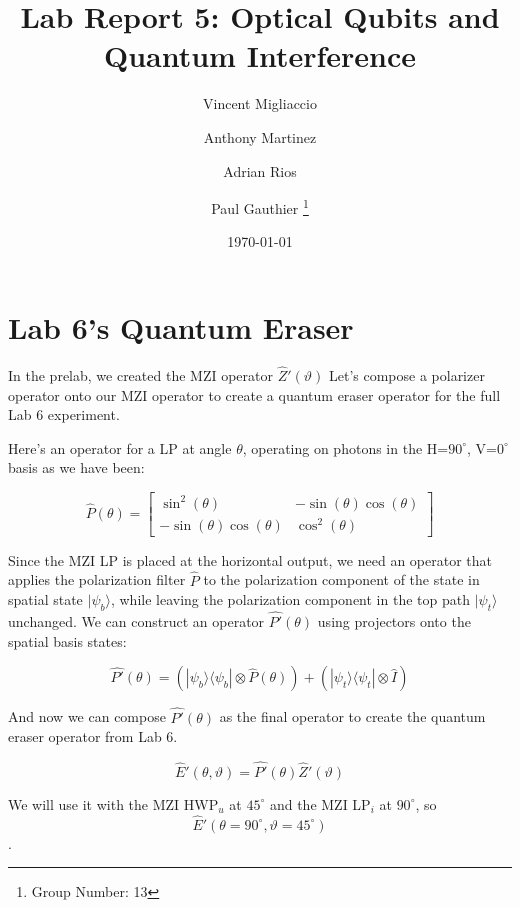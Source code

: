 \documentclass{article}
\title{Lab Report 5: Optical Qubits and Quantum Interference}
\author{
  Vincent Migliaccio \and
  Anthony Martinez \and
  Adrian Rios \and
  Paul Gauthier
  \thanks{Group Number: 13} \\
}
\date{\today}
\begin{document}


\section*{Lab 6's Quantum Eraser}

In the prelab, we created the MZI operator $\hat{Z}'(\vartheta)$
Let's compose a polarizer operator onto our MZI operator
to create a quantum eraser operator for the full Lab 6 experiment.

Here's an operator for a LP at angle $\theta$,
operating on photons in the H=$90^\circ$, V=$0^\circ$ basis as we have been:

$$\hat{P}(\theta) = \left[\begin{matrix}\sin^{2}{\left(\theta \right)} & - \sin{\left(\theta \right)} \cos{\left(\theta \right)}\\- \sin{\left(\theta \right)} \cos{\left(\theta \right)} & \cos^{2}{\left(\theta \right)}\end{matrix}\right]$$


Since the MZI LP is placed at the horizontal output, 
we need an operator that applies the polarization filter $\hat{P}$
to the polarization component of the state in spatial state $|\psi_b\rangle$,
while leaving the polarization component in the top path $|\psi_t\rangle$ unchanged.
We can construct an operator $\hat{P'}(\theta)$
using projectors onto the spatial basis states:

$$  \hat{P'}(\theta) = (|\psi_b\rangle\langle\psi_b| \otimes \hat{P}(\theta)) + (|\psi_t\rangle\langle\psi_t| \otimes \hat{I}) $$

And now we can compose $\hat{P'}(\theta)$ as the final operator to create
the quantum eraser operator from Lab 6.

$$\hat{E}'(\theta,\vartheta) = \hat{P'}(\theta) \hat{Z}'(\vartheta)$$

We will use it with the MZI HWP$_u$ at $45^\circ$ and the
MZI LP$_i$ at $90^\circ$, so
$$\hat{E}'(\theta=90^\circ,\vartheta=45^\circ)$$.
\end{document}
